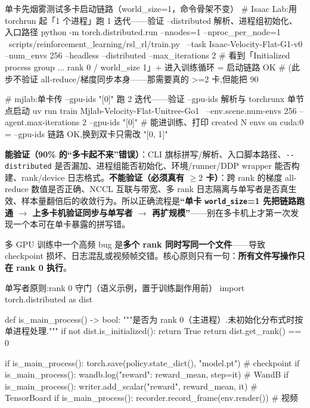 \begin{codebox}[bash]{单卡先烟雾测试多卡启动链路（world\_size=1，命令骨架不变）}
# Isaac Lab:用 torchrun 起「1 个进程」跑 1 迭代——验证 --distributed 解析、进程组初始化、入口路径
python -m torch.distributed.run --nnodes=1 --nproc_per_node=1 \
    scripts/reinforcement_learning/rsl_rl/train.py \
    --task Isaac-Velocity-Flat-G1-v0 --num_envs 256 --headless --distributed --max_iterations 2
#   看到「Initialized process group ... rank 0 / world_size 1」+ 进入训练循环 = 启动链路 OK
#   (此步不验证 all-reduce/梯度同步本身——那需要真的 >=2 卡,但能把 90%

# mjlab:单卡传 --gpu-ids "[0]" 跑 2 迭代——验证 --gpu-ids 解析与 torchrunx 单节点启动
uv run train Mjlab-Velocity-Flat-Unitree-Go1 \
    --env.scene.num-envs 256 --agent.max-iterations 2 --gpu-ids "[0]"
#   能进训练、打印 created N envs on cuda:0 = --gpu-ids 链路 OK,换到双卡只需改 "[0, 1]"
\end{codebox}

\begin{note}
\textbf{能验证（90\% 的“多卡起不来”错误）}：CLI 旗标拼写/解析、入口脚本路径、\verb|--distributed| 是否漏加、进程组能否初始化、环境/runner/DDP wrapper 能否构建、rank/device 日志格式。\textbf{不能验证（必须真有 $\ge 2$ 卡）}：跨 rank 的梯度 all-reduce 数值是否正确、NCCL 互联与带宽、多 rank 日志隔离与单写者是否真生效、样本量翻倍后的收敛行为。所以正确流程是\textbf{“单卡 \texttt{world\_size}=1 先把链路跑通 $\to$ 上多卡机验证同步与单写者 $\to$ 再扩规模”}——别在多卡机上才第一次发现一个本可在单卡暴露的拼写错。
\end{note}

多 GPU 训练中一个高频 bug 是\textbf{多个 rank 同时写同一个文件}——导致 checkpoint 损坏、日志混乱或视频帧交错。核心原则只有一句：\textbf{所有文件写操作只在 rank 0 执行}。

\begin{codebox}[Python]{单写者原则:rank 0 守门（语义示例，置于训练副作用前）}
import torch.distributed as dist

def is_main_process() -> bool:
    """是否为 rank 0（主进程）.未初始化分布式时按单进程处理."""
    if not dist.is_initialized():
        return True
    return dist.get_rank() == 0

if is_main_process():
    torch.save(policy.state_dict(), "model.pt")      # checkpoint
if is_main_process():
    wandb.log({"reward": reward_mean}, step=it)       # WandB
if is_main_process():
    writer.add_scalar("reward", reward_mean, it)      # TensorBoard
if is_main_process():
    recorder.record_frame(env.render())               # 视频
\end{codebox}

